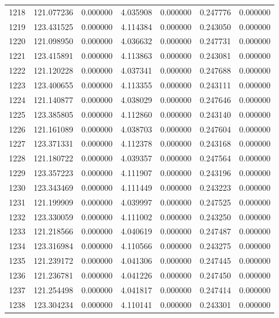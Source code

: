 \begin{tabular}{rrrrrrr}
1218 & 121.077236 &    0.000000 &  4.035908 &   0.000000 &   0.247776 &  0.000000 \\
1219 & 123.431525 &    0.000000 &  4.114384 &   0.000000 &   0.243050 &  0.000000 \\
1220 & 121.098950 &    0.000000 &  4.036632 &   0.000000 &   0.247731 &  0.000000 \\
1221 & 123.415891 &    0.000000 &  4.113863 &   0.000000 &   0.243081 &  0.000000 \\
1222 & 121.120228 &    0.000000 &  4.037341 &   0.000000 &   0.247688 &  0.000000 \\
1223 & 123.400655 &    0.000000 &  4.113355 &   0.000000 &   0.243111 &  0.000000 \\
1224 & 121.140877 &    0.000000 &  4.038029 &   0.000000 &   0.247646 &  0.000000 \\
1225 & 123.385805 &    0.000000 &  4.112860 &   0.000000 &   0.243140 &  0.000000 \\
1226 & 121.161089 &    0.000000 &  4.038703 &   0.000000 &   0.247604 &  0.000000 \\
1227 & 123.371331 &    0.000000 &  4.112378 &   0.000000 &   0.243168 &  0.000000 \\
1228 & 121.180722 &    0.000000 &  4.039357 &   0.000000 &   0.247564 &  0.000000 \\
1229 & 123.357223 &    0.000000 &  4.111907 &   0.000000 &   0.243196 &  0.000000 \\
1230 & 123.343469 &    0.000000 &  4.111449 &   0.000000 &   0.243223 &  0.000000 \\
1231 & 121.199909 &    0.000000 &  4.039997 &   0.000000 &   0.247525 &  0.000000 \\
1232 & 123.330059 &    0.000000 &  4.111002 &   0.000000 &   0.243250 &  0.000000 \\
1233 & 121.218566 &    0.000000 &  4.040619 &   0.000000 &   0.247487 &  0.000000 \\
1234 & 123.316984 &    0.000000 &  4.110566 &   0.000000 &   0.243275 &  0.000000 \\
1235 & 121.239172 &    0.000000 &  4.041306 &   0.000000 &   0.247445 &  0.000000 \\
1236 & 121.236781 &    0.000000 &  4.041226 &   0.000000 &   0.247450 &  0.000000 \\
1237 & 121.254498 &    0.000000 &  4.041817 &   0.000000 &   0.247414 &  0.000000 \\
1238 & 123.304234 &    0.000000 &  4.110141 &   0.000000 &   0.243301 &  0.000000 \\

\end{tabular}
